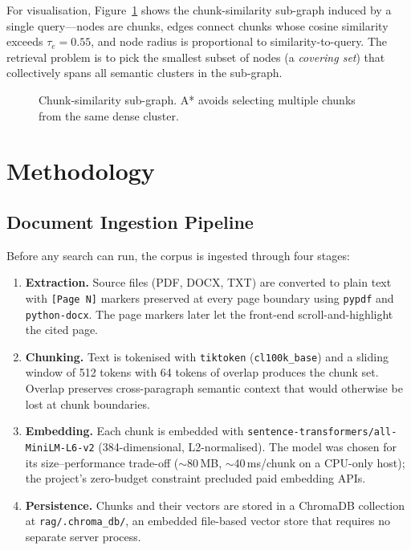 \documentclass[conference]{IEEEtran}
\begin{document}
For visualisation, Figure~\ref{fig:graph} shows the chunk-similarity sub-graph
induced by a single query---nodes are chunks, edges connect chunks whose cosine
similarity exceeds $\tau_e = 0.55$, and node radius is proportional to
similarity-to-query. The retrieval problem is to pick the smallest subset of
nodes (a \textit{covering set}) that collectively spans all semantic clusters
in the sub-graph.

\begin{figure}[t]
  \centering
  \caption{Chunk-similarity sub-graph. A* avoids selecting multiple chunks
           from the same dense cluster.}
  \label{fig:graph}
\end{figure}

\section{Methodology}
\label{sec:methodology}

\subsection{Document Ingestion Pipeline}

Before any search can run, the corpus is ingested through four stages:

\begin{enumerate}
  \item \textbf{Extraction.} Source files (PDF, DOCX, TXT) are converted to
    plain text with \texttt{[Page N]} markers preserved at every page boundary
    using \texttt{pypdf} and \texttt{python-docx}. The page markers later let
    the front-end scroll-and-highlight the cited page.
  \item \textbf{Chunking.} Text is tokenised with \texttt{tiktoken}
    (\texttt{cl100k\_base}) and a sliding window of 512 tokens with 64 tokens
    of overlap produces the chunk set. Overlap preserves cross-paragraph
    semantic context that would otherwise be lost at chunk boundaries.
  \item \textbf{Embedding.} Each chunk is embedded with
    \texttt{sentence-transformers/all-MiniLM-L6-v2} (384-dimensional,
    L2-normalised). The model was chosen for its size--performance trade-off
    ($\sim$80\,MB, $\sim$40\,ms/chunk on a CPU-only host); the project's
    zero-budget constraint precluded paid embedding APIs.
  \item \textbf{Persistence.} Chunks and their vectors are stored in a
    ChromaDB collection at \texttt{rag/.chroma\_db/}, an embedded file-based
    vector store that requires no separate server process.
\end{enumerate}
\end{document}
